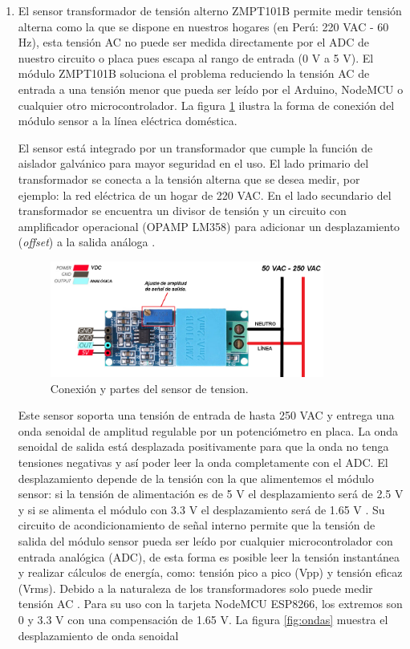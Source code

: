 \begin{enumerate}
\item  {}

El sensor transformador de tensión alterno ZMPT101B permite medir tensión alterna como la que se dispone en nuestros hogares (en Perú: 220 VAC - 60 Hz), esta tensión AC no puede ser medida directamente por el ADC de nuestro circuito o placa pues escapa al rango de entrada (0 V a 5 V). El módulo ZMPT101B soluciona el problema reduciendo la tensión AC de entrada a una tensión menor que pueda ser leído por el Arduino, NodeMCU o cualquier otro microcontrolador. La figura \ref{fig:sensortension} ilustra la forma de conexión del módulo sensor a la línea eléctrica doméstica.

El sensor está integrado por un transformador que cumple la función de aislador galvánico para mayor seguridad en el uso. El lado primario del transformador se conecta a la tensión alterna que se desea medir, por ejemplo: la red eléctrica de un hogar de 220 VAC. En el lado secundario del transformador se encuentra un divisor de tensión y un circuito con amplificador operacional (OPAMP LM358) para adicionar un desplazamiento (\emph{offset}) a la salida análoga \citep{WEBSITE:22}. 

\begin{figure}[htpb]
\centering 
\includegraphics[width=0.85\textwidth]{./Figures/sensortension.png}
\caption{Conexión y partes del sensor de tension.}
\label{fig:sensortension}
\end{figure}


Este sensor soporta una tensión de entrada de hasta 250 VAC y entrega una onda senoidal de amplitud regulable por un potenciómetro en placa. La onda senoidal de salida está desplazada positivamente para que la onda no tenga tensiones negativas y así poder leer la onda completamente con el ADC. El desplazamiento depende de la tensión con la que alimentemos el módulo sensor: si la tensión de alimentación es de 5 V el desplazamiento será de 2.5 V y si se alimenta el módulo con 3.3 V el desplazamiento será de 1.65 V \citep{WEBSITE:23}. Su circuito de acondicionamiento de señal interno permite que la tensión de salida del módulo sensor pueda ser leído por cualquier microcontrolador con entrada analógica (ADC), de esta forma es posible leer la tensión instantánea y realizar cálculos de energía, como: tensión pico a pico (Vpp) y tensión eficaz (Vrms). Debido a la naturaleza de los transformadores solo puede medir tensión AC \citep{WEBSITE:22} \citep{ARTICLE:1}. Para su uso con la tarjeta NodeMCU ESP8266, los extremos son 0 y 3.3 V con una compensación de 1.65 V. La figura \ref{fig:ondas} muestra el desplazamiento de onda senoidal



\end{enumerate}

